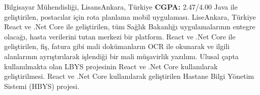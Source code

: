 \documentclass[
    10pt,
    A4,
    english,
    draft = false,
    twoside = false,
]{article}
\begin{document}

	{Bilgisayar Mühendisliği, Lisans}{Ankara, Türkiye}
	{\textbf{CGPA:} 2.47/4.00}
    {
      {Java ile geliştirilen, postacılar için rota planlama mobil uygulaması.}
    }
	{Lise}{Ankara, Türkiye}{}
    {
      {React ve .Net Core ile geliştirilen, tüm Sağlık Bakanlığı uygulamalarının entegre olacağı, hasta verilerini tutan merkezi bir platform.}
      {React ve .Net Core ile geliştirilen, fiş, fatura gibi mali dokümanların OCR ile okunarak  ve ilgili alanlarının ayrıştırılarak işlendiği bir mali müşavirlik yazılımı.}
    }
    {
      {Ulusal çapta kullanılmakta olan LBYS projesinin React ve .Net Core kullanılarak geliştirilmesi.}
      {React ve .Net Core kullanılarak geliştirilen Hastane Bilgi Yönetim Sistemi (HBYS) projesi.}
    }
\end{document}
